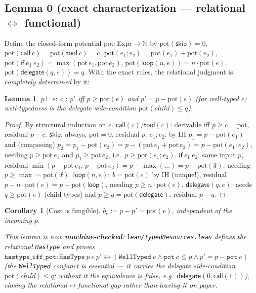 \documentclass[11pt]{article}
\theoremstyle{plain}
\newtheorem*{lemmaU}{Lemma}
\newtheorem*{corollaryU}{Corollary}
\newcommand{\kw}[1]{\mathsf{#1}}                      %
\newcommand{\J}[3]{#1 \vdash #2 : \diamond\,;\,#3}    %
\newcommand{\pot}{\mathrm{pot}}
\begin{document}
\subsection{Lemma 0 (exact characterization --- relational \texorpdfstring{$\Longleftrightarrow$}{<=>} functional)}

Define the closed-form potential $\pot : \mathrm{Expr} \to \mathbb{N}$ by $\pot(\kw{skip}) = 0$,
$\pot(\kw{call}\ c) = \pot(\kw{tool}\ c) = c$, $\pot(e_1 ; e_2) = \pot(e_1) + \pot(e_2)$,
$\pot(\kw{if}\ e_1\ e_2) = \max(\pot\, e_1, \pot\, e_2)$, $\pot(\kw{loop}(n, e)) = n \cdot \pot(e)$,
$\pot(\kw{delegate}(q, e)) = q$. With the exact rules, the relational judgment is \emph{completely
determined} by it:

\begin{lemmaU}
$\J{p}{e}{p'}$ iff $p \ge \pot(e)$ and $p' = p - \pot(e)$ (for well-typed $e$; well-typedness is
the delegate side-condition $\pot(\mathit{child}) \le q$).
\end{lemmaU}

\begin{proof}
By structural induction on $e$. $\kw{call}(c)$/$\kw{tool}(c)$: derivable iff $p \ge c = \pot$,
residual $p - c$. $\kw{skip}$: always, $\pot = 0$, residual $p$. $e_1 ; e_2$: by IH
$p_1 = p - \pot(e_1)$ and (composing) $p_2 = p_1 - \pot(e_2) = p - (\pot\, e_1 + \pot\, e_2) =
p - \pot(e_1 ; e_2)$, needing $p \ge \pot\, e_1$ and $p_1 \ge \pot\, e_2$, i.e.\
$p \ge \pot(e_1 ; e_2)$. $\kw{if}\ e_1\ e_2$: same input $p$, residual
$\min(p - \pot\, e_1,\, p - \pot\, e_2) = p - \max(\dots) = p - \pot(\kw{if})$, needing
$p \ge \max = \pot(\kw{if})$. $\kw{loop}(n, e)$: $b = \pot(e)$ by IH (unique!), residual
$p - n \cdot \pot(e) = p - \pot(\kw{loop})$, needing $p \ge n \cdot \pot(e)$.
$\kw{delegate}(q, e)$: needs $q \ge \pot(e)$ (child types) and $p \ge q = \pot(\kw{delegate})$,
residual $p - q$.
\end{proof}

\begin{corollaryU}[Cost is fungible]
$b_e := p - p' = \pot(e)$, independent of the incoming $p$.
\end{corollaryU}

\emph{This lemma is now \textbf{machine-checked}: \texttt{lean/TypedResources.lean} defines the
relational \texttt{HasType} and proves
$\texttt{hastype\_iff\_pot} : \texttt{HasType}\ p\ e\ p' \leftrightarrow
(\texttt{WellTyped}\ e \wedge \texttt{pot}\ e \le p \wedge p' = p - \texttt{pot}\ e)$
(the \texttt{WellTyped} conjunct is essential --- it carries the delegate side-condition
$\pot(\mathit{child}) \le q$; without it the equivalence is false, e.g.\
$\kw{delegate}(0, \kw{call}(1))$), closing the relational$\leftrightarrow$functional gap rather
than leaving it on paper.}
\end{document}
